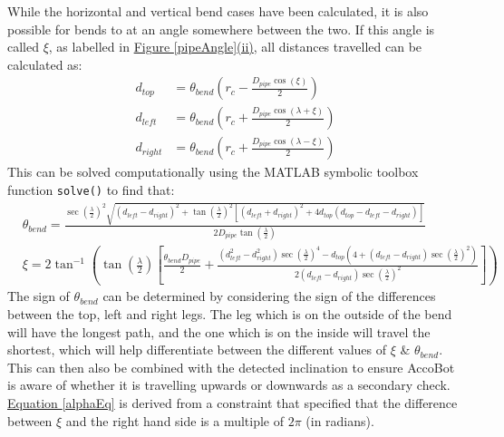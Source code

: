 \documentclass[11pt]{article}		%
\newcommand{\equationref}[1]{\hyperref[#1]{Equation \ref*{#1}}}     %
\begin{document}
			While the horizontal and vertical bend cases have been calculated, it is also possible for bends to at an angle somewhere between the two.
			If this angle is called $\xi$, as labelled in \hyperref[pipeAngle]{Figure \ref*{pipeAngle}(ii)}, all distances travelled can be calculated as:
			\begin{align}
				d_{top} &= \theta_{bend} \left( r_c - \frac{D_{pipe} \cos \left( \xi \right)}{2} \right) \label{d_top}
				\\
				d_{left} &= \theta_{bend} \left( r_c +  \frac{D_{pipe} \cos \left( \lambda + \xi \right)}{2} \right) \label{d_left}
				\\
				d_{right} &= \theta_{bend} \left( r_c +  \frac{D_{pipe} \cos \left( \lambda - \xi \right)}{2} \right) \label{d_right}
			\end{align}
			This can be solved computationally using the MATLAB symbolic toolbox function \verb|solve()| to find that:	
			\fontsize{10}{\baselineskip}
			\begin{align}
				&\theta_{bend} = \frac{ \sec \left( \frac{\lambda}{2} \right)^2 \sqrt{ \left( d_{left} - d_{right} \right)^2 +  \tan \left( \frac{\lambda}{2} \right)^2 \left[ \left( d_{left} + d_{right} \right)^2 + 4 d_{top} \left( d_{top} - d_{left} - d_{right} \right) \right] } }{2 D_{pipe} \tan \left( \frac{\lambda}{2} \right)} \label{generalTheta}
				\\
				&\xi = 2 \tan^{-1} \left( \tan \left( \frac{\lambda}{2} \right) \left[\frac{ \theta_{bend} D_{pipe}}{2} + \frac{\left( d_{left}^2 - d_{right}^2 \right) \sec \left( \frac{\lambda}{2} \right)^4 - d_{top} \left(4 + \left( d_{left} - d_{right} \right) \sec \left( \frac{\lambda}{2} \right)^2 \right)}{2 \left( d_{left} - d_{right} \right) \sec \left( \frac{\lambda}{2} \right)^2} \right] \right) \label{alphaEq}
			\end{align}
			\fontsize{11}{\baselineskip}
			The sign of $\theta_{bend}$ can be determined by considering the sign of the differences between the top, left and right legs.
			The leg which is on the outside of the bend will have the longest path, and the one which is on the inside will travel the shortest, which will help differentiate between the different values of $\xi$ \& $\theta_{bend}$.
			This can then also be combined with the detected inclination to ensure AccoBot is aware of whether it is travelling upwards or downwards as a secondary check.
			\\
			\equationref{alphaEq} is derived from a constraint that specified that the difference between $\xi$ and the right hand side is a multiple of $2 \pi$ (in radians).
\end{document}
